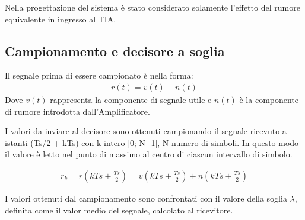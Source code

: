 \documentclass[12pt, a4paper]{article}
\begin{document}
\vspace{5mm}
Nella progettazione del sistema è stato considerato solamente l'effetto del rumore equivalente in ingresso al TIA.


\vspace{1cm}


\subsection{Campionamento e decisore a soglia}
\label{sub:decisore}


Il segnale prima di essere campionato è nella forma:
\begin{align}
	r(t) = v(t) + n(t)
\end{align}
Dove $v(t)$ rappresenta la componente di segnale utile e $n(t)$ è la componente di rumore introdotta dall'Amplificatore.

I valori da inviare al decisore sono ottenuti campionando il segnale ricevuto a istanti (Ts/2 + kTs) con k intero [0; N -1], N numero di simboli. In questo modo il valore è letto nel punto di massimo al centro di ciascun intervallo di simbolo.

\begin{align}
	r_k = r(kTs + \frac{Ts}{2}) = v(kTs + \frac{Ts}{2}) + n(kTs + \frac{Ts}{2})
\end{align}

I valori ottenuti dal campionamento sono confrontati con il valore della soglia $\lambda$, definita come il valor medio del segnale, calcolato al ricevitore.
\end{document}
